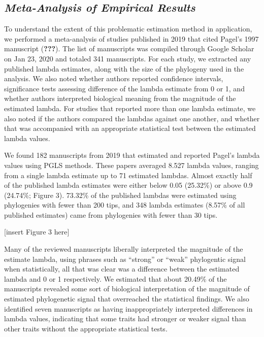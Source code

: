 \documentclass[]{article}
\begin{document}
\subsection{\texorpdfstring{\emph{Meta-Analysis of Empirical
Results}}{Meta-Analysis of Empirical Results}}\label{meta-analysis-of-empirical-results}

To understand the extent of this problematic estimation method in
application, we performed a meta-analysis of studies published in 2019
that cited Pagel's 1997 manuscript ({\textbf{???}}). The list of
manuscripts was compiled through Google Scholar on Jan 23, 2020 and
totaled 341 manuscripts. For each study, we extracted any published
lambda estimates, along with the size of the phylogeny used in the
analysis. We also noted whether authors reported confidence intervals,
significance tests assessing difference of the lambda estimate from 0 or
1, and whether authors interpreted biological meaning from the magnitude
of the estimated lambda. For studies that reported more than one lambda
estimate, we also noted if the authors compared the lambdas against one
another, and whether that was accompanied with an appropriate
statistical test between the estimated lambda values. \hfill\break

We found 182 manuscripts from 2019 that estimated and reported Pagel's
lambda values using PGLS methods. These papers averaged 8.527 lambda
values, ranging from a single lambda estimate up to 71 estimated
lambdas. Almost exactly half of the published lambda estimates were
either below 0.05 (25.32\%) or above 0.9 (24.74\%; Figure 3). 73.32\% of
the published lambdas were estimated using phylogenies with fewer than
200 tips, and 348 lambda estimates (8.57\% of all published estimates)
came from phylogenies with fewer than 30 tips. \hfill\break

{[}insert Figure 3 here{]} \hfill\break

Many of the reviewed manuscripts liberally interpreted the magnitude of
the estimate lambda, using phrases such as ``strong'' or ``weak''
phylogentic signal when statistically, all that was clear was a
difference between the estimated lambda and 0 or 1 respectively. We
estimated that about 20.49\% of the manuscripts revealed some sort of
biological interpretation of the magnitude of estimated phylogenetic
signal that overreached the statistical findings. We also identified
seven manuscripts as having inappropriately interpreted differences in
lambda values, indicating that some traits had stronger or weaker signal
than other traits without the appropriate statistical tests.
\hfill\break
\end{document}
